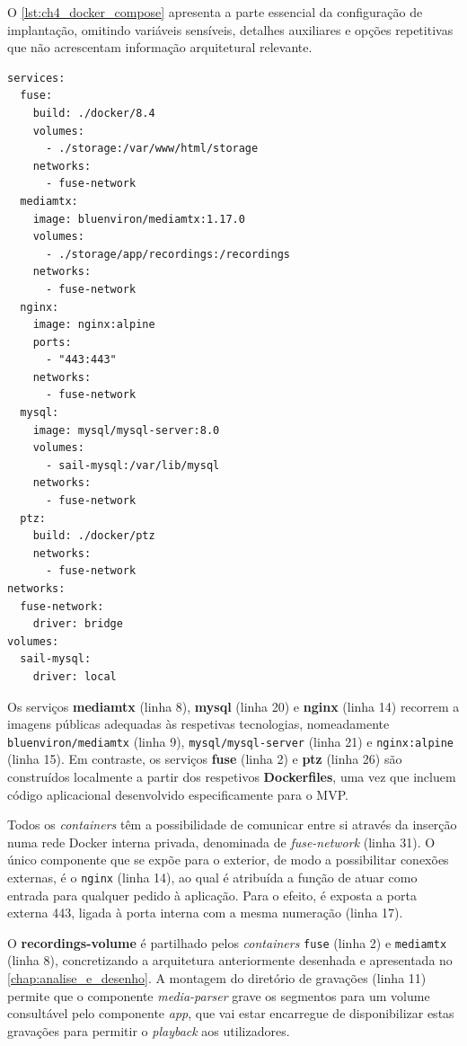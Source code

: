 O \autoref{lst:ch4_docker_compose} apresenta a parte essencial da configuração de implantação, omitindo variáveis sensíveis, detalhes auxiliares e opções repetitivas que não acrescentam informação arquitetural relevante.

\par\noindent\begin{minipage}{\linewidth}
\begin{lstlisting}[caption={Excerto simplificado da configuração Docker Compose do servidor central (yaml)},label={lst:ch4_docker_compose}]
services:
  fuse:
    build: ./docker/8.4
    volumes:
      - ./storage:/var/www/html/storage
    networks:
      - fuse-network
  mediamtx:
    image: bluenviron/mediamtx:1.17.0
    volumes:
      - ./storage/app/recordings:/recordings
    networks:
      - fuse-network
  nginx:
    image: nginx:alpine
    ports:
      - "443:443"
    networks:
      - fuse-network
  mysql:
    image: mysql/mysql-server:8.0
    volumes:
      - sail-mysql:/var/lib/mysql
    networks:
      - fuse-network
  ptz:
    build: ./docker/ptz
    networks:
      - fuse-network
networks:
  fuse-network:
    driver: bridge
volumes:
  sail-mysql:
    driver: local
\end{lstlisting}
\end{minipage}

Os serviços \textbf{mediamtx} (linha 8), \textbf{mysql} (linha 20) e \textbf{nginx} (linha 14) recorrem a imagens públicas adequadas às respetivas tecnologias, nomeadamente \texttt{bluenviron/mediamtx} (linha 9), \texttt{mysql/mysql-server} (linha 21) e \texttt{nginx:alpine} (linha 15). Em contraste, os serviços \textbf{fuse} (linha 2) e \textbf{ptz} (linha 26) são construídos localmente a partir dos respetivos \textbf{Dockerfiles}, uma vez que incluem código aplicacional desenvolvido especificamente para o \gls{MVP}.

Todos os \textit{containers} têm a possibilidade de comunicar entre si através da inserção numa rede Docker interna privada, denominada de \textit{fuse-network} (linha 31). O único componente que se expõe para o exterior, de modo a possibilitar conexões externas, é o \texttt{nginx} (linha 14), ao qual é atribuída a função de atuar como entrada para qualquer pedido à aplicação. Para o efeito, é exposta a porta externa 443, ligada à porta interna com a mesma numeração (linha 17).

O \textbf{recordings-volume} é partilhado pelos \textit{containers} \texttt{fuse} (linha 2) e \texttt{mediamtx} (linha 8), concretizando a arquitetura anteriormente desenhada e apresentada no \autoref{chap:analise_e_desenho}. A montagem do diretório de gravações (linha 11) permite que o componente \textit{media-parser} grave os segmentos para um volume consultável pelo componente \textit{app}, que vai estar encarregue de disponibilizar estas gravações para permitir o \textit{playback} aos utilizadores.

